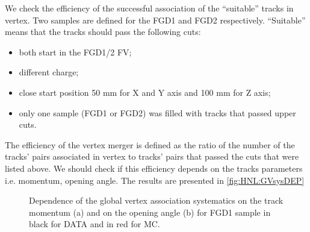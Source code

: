 \documentclass[../main.tex]{subfiles}
\begin{document}
We check the efficiency of the successful association of the ``suitable'' tracks in vertex. Two samples are defined for the FGD1 and FGD2 respectively. ``Suitable'' means that the tracks should pass the following cuts:
\begin{itemize}
    \item both start in the FGD1/2 FV;
    \item different charge;
    \item close start position 50 mm for X and Y axis and 100 mm for Z axis;
    \item only one sample (FGD1 or FGD2) was filled with tracks that passed upper cuts.
\end{itemize}
The efficiency of the vertex merger is defined as the ratio of the number of the tracks' pairs associated in vertex to tracks' pairs that passed the cuts that were listed above. We should check if this efficiency depends on the tracks parameters i.e. momentum, opening angle. The results are presented in \autoref{fig:HNL:GVsysDEP}
\begin{figure}[!ht]
    \begin{minipage}[h]{0.49\linewidth}
    \end{minipage}
    \hfill
    \begin{minipage}[h]{0.49\linewidth}
    \end{minipage}
    \vfill
    \begin{minipage}[h]{0.49\linewidth}
    \end{minipage}
    \hfill
    \begin{minipage}[h]{0.49\linewidth}
    \end{minipage}
    \caption{Dependence of the global vertex association systematics on the  track momentum (a) and on the opening angle (b) for FGD1 sample in black for DATA and in red for MC.}
    \label{fig:HNL:GVsysDEP}
\end{figure}
\end{document}
